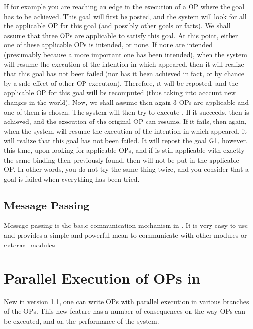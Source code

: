 If for example you are reaching an edge in the execution of a OP where the goal
 has to be achieved. This goal will first be posted, and the system
will look for all the applicable OP for this goal (and possibly other goals or
facts). We shall assume that three OPs are applicable to satisfy this goal. At this
point, either one of these applicable OPs is intended, or none. If none are
intended (presumably because a more important one has been intended), when the
system will resume the execution of the intention in which  appeared,
then it will realize that this goal has not been failed (nor has it been
achieved in fact, or by chance by a side effect of other OP execution).
Therefore, it will be reposted, and the applicable OP for this goal will be
recomputed (thus taking into account new changes in the world). Now, we shall
assume then again 3 OPs are applicable and  one of them is chosen.
The system will then try to execute . If it succeeds, then 
is achieved, and the execution of the original OP can resume. If it fails, then
again, when the system will resume the execution of the intention in which
 appeared, it will realize that this goal has not been failed. It
will repost the goal G1, however, this time, upon looking for applicable OPs,
and if  is still applicable with exactly the same binding then
previously found, then  will not be put in the applicable OP. In
other words, you do not try the same thing twice, and you consider that a goal
is failed when everything has been tried.

\section{Message Passing}

Message passing is the basic communication mechanism in \COPRS{}. It is
very easy to use and provides a simple and powerful mean to communicate
with other \COPRS{} modules or external modules.

\chapter{Parallel Execution of OPs in \COPRS{}}

New in version 1.1, one can write OPs with parallel execution in various
branches of the OPs. This new feature has a number of consequences on the way
OPs can be executed, and on the performance of the system.



